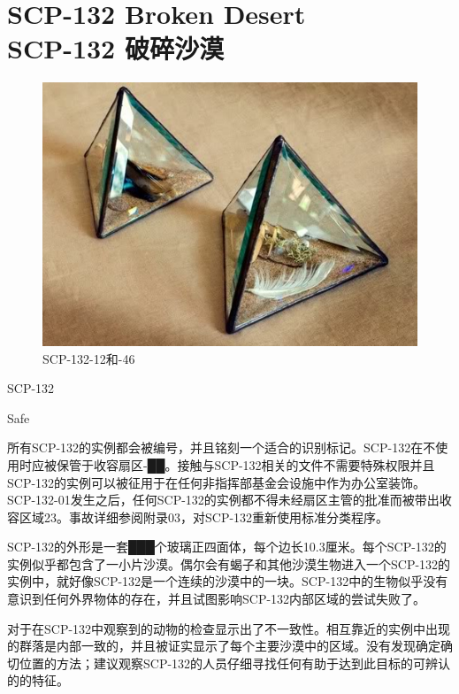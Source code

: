 \chapter[SCP-132 破碎沙漠]{
    SCP-132 Broken Desert\\
    SCP-132 破碎沙漠
}

\label{chap:SCP-132}

\begin{figure}[H]
    \centering
    \includegraphics[width=0.5\linewidth]{images/SCP-132.jpg}
    \caption*{SCP-132-12和-46}
\end{figure}

SCP-132

Safe

所有SCP-132的实例都会被编号，并且铭刻一个适合的识别标记。SCP-132在不使用时应被保管于收容扇区-██。接触与SCP-132相关的文件不需要特殊权限并且SCP-132的实例可以被征用于在任何非指挥部基金会设施中作为办公室装饰。SCP-132-01发生之后，任何SCP-132的实例都不得未经扇区主管的批准而被带出收容区域23。事故详细参阅附录03，对SCP-132重新使用标准分类程序。

SCP-132的外形是一套███个玻璃正四面体，每个边长10.3厘米。每个SCP-132的实例似乎都包含了一小片沙漠。偶尔会有蝎子和其他沙漠生物进入一个SCP-132的实例中，就好像SCP-132是一个连续的沙漠中的一块。SCP-132中的生物似乎没有意识到任何外界物体的存在，并且试图影响SCP-132内部区域的尝试失败了。

对于在SCP-132中观察到的动物的检查显示出了不一致性。相互靠近的实例中出现的群落是内部一致的，并且被证实显示了每个主要沙漠中的区域。没有发现确定确切位置的方法；建议观察SCP-132的人员仔细寻找任何有助于达到此目标的可辨认的的特征。

